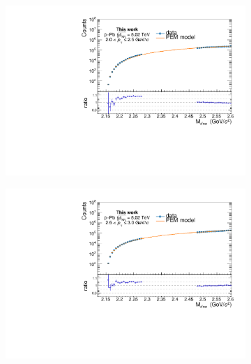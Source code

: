 \begin{appendices}
\begin{figure}[htb]
\begin{subfigure}{.5\textwidth}
  \centering
  \captionsetup{justification=centering}
  \includegraphics[width=\linewidth]{gfx/appendix/pem/can_blindPEM4}
  \caption{}
\end{subfigure}%
\begin{subfigure}{.5\textwidth}
  \centering
  \captionsetup{justification=centering}
  \includegraphics[width=\linewidth]{gfx/appendix/pem/can_blindPEM5}
  \caption{}
\end{subfigure}
\begin{subfigure}{.5\textwidth}
  \centering
  \captionsetup{justification=centering}

\end{subfigure}
\end{figure}
\end{appendices}
